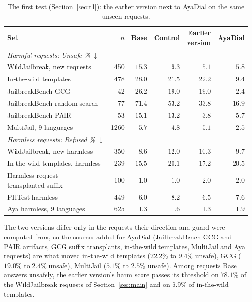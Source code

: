 \documentclass[10pt,a4paper]{article}
\renewcommand{\arraystretch}{1.12}
\begin{document}
\begin{table}[H]\centering\small\renewcommand{\arraystretch}{1.25}\begin{tabular}{|l|r|r|r|r|r|}\hline
Set & $n$ & Base & Control & \makecell[r]{Earlier\\version} & AyaDial\\\hline
\multicolumn{6}{|l|}{\textit{Harmful requests: Unsafe \% $\downarrow$}}\\\hline
WildJailbreak, new requests & 450 & $15.3$ & $9.3$ & $5.1$ & $5.8$\\\hline
In-the-wild templates & 478 & $28.0$ & $21.5$ & $22.2$ & $9.4$\\\hline
JailbreakBench GCG & 42 & $26.2$ & $19.0$ & $19.0$ & $2.4$\\\hline
JailbreakBench random search & 77 & $71.4$ & $53.2$ & $33.8$ & $16.9$\\\hline
JailbreakBench PAIR & 53 & $15.1$ & $13.2$ & $3.8$ & $5.7$\\\hline
MultiJail, 9 languages & 1260 & $5.7$ & $4.8$ & $5.1$ & $2.5$\\\hline
\multicolumn{6}{|l|}{\textit{Harmless requests: Refused \% $\downarrow$}}\\\hline
WildJailbreak, new harmless & 350 & $8.6$ & $12.0$ & $10.3$ & $9.7$\\\hline
In-the-wild templates, harmless & 239 & $15.5$ & $20.1$ & $17.2$ & $20.5$\\\hline
Harmless request + transplanted suffix & 100 & $1.0$ & $1.0$ & $2.0$ & $2.0$\\\hline
PHTest harmless & 449 & $6.0$ & $8.2$ & $6.5$ & $7.6$\\\hline
Aya harmless, 9 languages & 625 & $1.3$ & $1.6$ & $1.3$ & $1.9$\\\hline
\end{tabular}
\caption{The first test (Section~\ref{sec:t1}): the earlier version next to AyaDial on the same unseen requests.}\label{tab:app2}\end{table}
The two versions differ only in the requests their direction and guard were computed from, so the sources added for AyaDial (JailbreakBench GCG and PAIR artifacts, GCG suffix transplants, in-the-wild templates, MultiJail and Aya requests) are what moved in-the-wild templates ($22.2$\% to $9.4$\% unsafe), GCG ($19.0$\% to $2.4$\% unsafe), MultiJail ($5.1$\% to $2.5$\% unsafe). Among requests Base answers unsafely, the earlier version's harm score passes its threshold on $78.1$\% of the WildJailbreak requests of Section~\ref{sec:main} and on $6.9$\% of in-the-wild templates.
\end{document}
